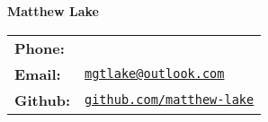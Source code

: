 \documentclass[a4paper]{article}
\def\name{Matthew Lake}
\newcommand{\accentcolour}{\color{NavyBlue}}
\begin{document}
\centerline{\Huge \rmfamily \accentcolour \bfseries \name}


\begin{center}
	\begin{tabular}{ll}
		\textbf{Phone:} 		&  \\
		\textbf{Email:} 		& \href{mailto:mgtlake@outlook.com}{\tt mgtlake@outlook.com} \\
		\textbf{Github:}		& \href{https://github.com/matthew-lake}{\tt github.com/matthew-lake}
	\end{tabular}
\end{center}
\titlespacing*{\section}{-30pt}{0.5ex}{1ex}
\end{document}
